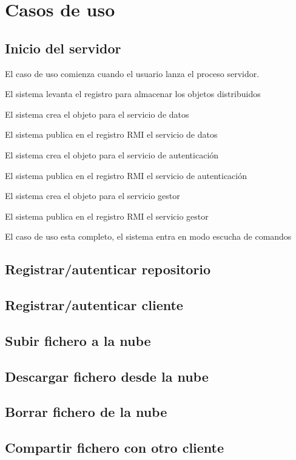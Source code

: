 \chapter{Casos de uso}

\section{Inicio del servidor}

\begin{compactenum}
	\item El caso de uso comienza cuando el usuario lanza el proceso servidor.
	\item El sistema levanta el registro para almacenar los objetos distribuidos
	\item El sistema crea el objeto para el servicio de datos
	\item El sistema publica en el registro RMI el servicio de datos
	\item El sistema crea el objeto para el servicio de autenticación
	\item El sistema publica en el registro RMI el servicio de autenticación
	\item El sistema crea el objeto para el servicio gestor
	\item El sistema publica en el registro RMI el servicio gestor
	\item El caso de uso esta completo, el sistema entra en modo escucha de comandos
\end{compactenum}

\section{Registrar/autenticar repositorio}

\section{Registrar/autenticar cliente}

\section{Subir fichero a la nube}

\section{Descargar fichero desde la nube}

\section{Borrar fichero de la nube}

\section{Compartir fichero con otro cliente}
